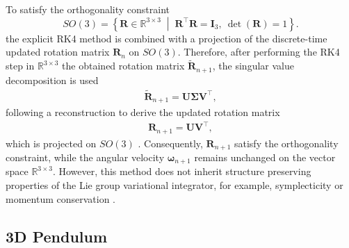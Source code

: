To satisfy the orthogonality constraint 
\[
SO(3)
=
\left\{
\bm{R}\in\mathbb{R}^{3\times 3}
\;\middle|\;
\bm{R}^\top \bm{R}=\bm{I}_3,\ 
\det(\bm{R})=1
\right\}.\]
the explicit RK4 method is combined with a projection of the discrete-time updated rotation matrix $\bm{R}_n$ on $SO(3)$. Therefore, after performing the RK4 step in $\mathbb{R}^{3 \times 3}$ the obtained rotation matrix \(\widetilde{\bm{R}}_{n+1}\), the singular value decomposition is used  
\begin{align}
    \widetilde{\bm{R}}_{n+1}=\bm{U}\bm{\Sigma}\bm{V}^{\top},
\end{align}
following a reconstruction to derive the updated rotation matrix
\begin{align}
    \bm{R}_{n+1}=\bm{U}\bm{V}^{\top},
\end{align}
 which is projected on $SO(3)$ \cite{YanaiTakeuchiTakane2011SVD}. Consequently, $\bm{R}_{n+1}$ satisfy the orthogonality constraint, while the angular velocity $\bm{\omega}_{n+1}$ remains unchanged on the vector space $\mathbb{R}^{3 \times 3}$. However, this method does not inherit structure preserving properties of the Lie group variational integrator, for example, symplecticity or momentum conservation \cite{CELLEDONI2003421}. 

\subsection{3D Pendulum}

